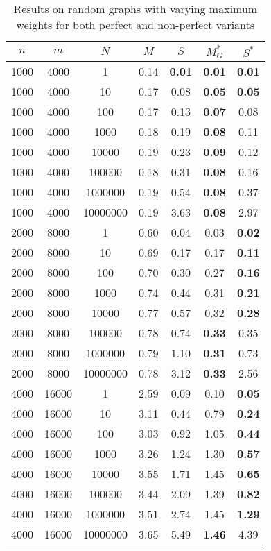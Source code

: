 \begin{table}
\centering
\begin{tabular}{
ccc|cc|cc}
$n$ & $m$ & $N$ & $M$ & $S$ & $M^*_G$ & $S^*$ \\
\hline
1000 & 4000 & 1 & 0.14 & \textbf{0.01} & \textbf{0.01} & \textbf{0.01} \\
1000 & 4000 & 10 & 0.17 & 0.08 & \textbf{0.05} & \textbf{0.05} \\
1000 & 4000 & 100 & 0.17 & 0.13 & \textbf{0.07} & 0.08 \\
1000 & 4000 & 1000 & 0.18 & 0.19 & \textbf{0.08} & 0.11 \\
1000 & 4000 & 10000 & 0.19 & 0.23 & \textbf{0.09} & 0.12 \\
1000 & 4000 & 100000 & 0.18 & 0.31 & \textbf{0.08} & 0.16 \\
1000 & 4000 & 1000000 & 0.19 & 0.54 & \textbf{0.08} & 0.37 \\
1000 & 4000 & 10000000 & 0.19 & 3.63 & \textbf{0.08} & 2.97 \\
2000 & 8000 & 1 & 0.60 & 0.04 & 0.03 & \textbf{0.02} \\
2000 & 8000 & 10 & 0.69 & 0.17 & 0.17 & \textbf{0.11} \\
2000 & 8000 & 100 & 0.70 & 0.30 & 0.27 & \textbf{0.16} \\
2000 & 8000 & 1000 & 0.74 & 0.44 & 0.31 & \textbf{0.21} \\
2000 & 8000 & 10000 & 0.77 & 0.57 & 0.32 & \textbf{0.28} \\
2000 & 8000 & 100000 & 0.78 & 0.74 & \textbf{0.33} & 0.35 \\
2000 & 8000 & 1000000 & 0.79 & 1.10 & \textbf{0.31} & 0.73 \\
2000 & 8000 & 10000000 & 0.78 & 3.12 & \textbf{0.33} & 2.56 \\
4000 & 16000 & 1 & 2.59 & 0.09 & 0.10 & \textbf{0.05} \\
4000 & 16000 & 10 & 3.11 & 0.44 & 0.79 & \textbf{0.24} \\
4000 & 16000 & 100 & 3.03 & 0.92 & 1.05 & \textbf{0.44} \\
4000 & 16000 & 1000 & 3.26 & 1.24 & 1.30 & \textbf{0.57} \\
4000 & 16000 & 10000 & 3.55 & 1.71 & 1.45 & \textbf{0.65} \\
4000 & 16000 & 100000 & 3.44 & 2.09 & 1.39 & \textbf{0.82} \\
4000 & 16000 & 1000000 & 3.51 & 2.74 & 1.45 & \textbf{1.29} \\
4000 & 16000 & 10000000 & 3.65 & 5.49 & \textbf{1.46} & 4.39 \\
\end{tabular}
\caption{Results on random graphs with varying maximum weights for both perfect and non-perfect variants}\label{tab:weight}
\end{table}

